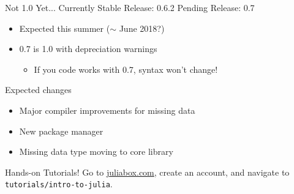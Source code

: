 \documentclass[11pt]{beamer}
\begin{document}
\begin{frame}[c]{Not 1.0 Yet...}
Currently Stable Release: 0.6.2
Pending Release: 0.7
\begin{itemize}
    \item Expected this summer ($\sim$ June 2018?)
    \item 0.7 is 1.0 with depreciation warnings
    \begin{itemize}
        \item If you code works with 0.7, syntax won't change!
    \end{itemize}
\end{itemize}
\end{frame}

\begin{frame}[c]{Expected changes}
\begin{itemize}
    \pause \item Major compiler improvements for missing data
    \pause \item New package manager
    \pause \item Missing data type moving to core library
\end{itemize}
\end{frame}

\begin{frame}[c]{Hands-on Tutorials!}
    Go to \url{juliabox.com}, create an account, and navigate to \texttt{tutorials/intro-to-julia}.
\end{frame}
\end{document}
